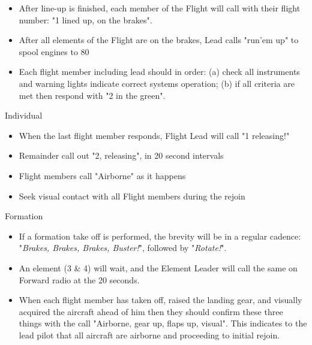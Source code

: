 \begin{itemize}

  \item After line-up is finished, each member of the Flight will call with
    their flight number: "1 lined up, on the brakes".

  \item After all elements of the Flight are on the brakes, Lead calls "run'em
    up" to spool engines to 80%

  \item Each flight member including lead should in order: (a) check all
    instruments and warning lights indicate correct systems operation; (b) if
    all criteria are met then respond with "2 in the green".

\end{itemize}

Individual

\begin{itemize}

  \item When the last flight member responds, Flight Lead will call "1
    releasing!"

  \item Remainder call out "2, releasing", in 20 second intervals

  \item Flight members call "Airborne" as it happens

  \item Seek visual contact with all Flight members during the rejoin

\end{itemize}

Formation

\begin{itemize}

  \item If a formation take off is performed, the brevity will be in a regular
    cadence: "\textit{Brakes, Brakes, Brakes, Buster!}", followed by
    "\textit{Rotate!}".

  \item An element (3 \& 4) will wait, and the Element Leader will call the
    same on Forward radio at the 20 seconds.

  \item When each flight member has taken off, raised the landing gear, and
    visually acquired the aircraft ahead of him then they should confirm these
    three things with the call "Airborne, gear up, flaps up, visual". This
    indicates to the lead pilot that all aircraft are airborne and proceeding
    to initial rejoin.

\end{itemize}

